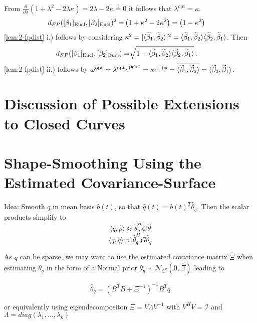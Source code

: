 From $\frac{\partial}{\partial\lambda}\left( 1 + \lambda^2 - 2\lambda\kappa \right) = 2\lambda - 2\kappa \overset{!}{=} 0$ it follows that $\lambda^\mathrm{opt} = \kappa$.
\begin{align*}
  d_{FP}([\beta_1]_{\mathrm{Eucl}},[\beta_2]_{\mathrm{Eucl}})^2 
   = &  \left( 1 + \kappa^2  - 2 \kappa^2 \right) =  \left( 1 - \kappa^2 \right)
\end{align*}
\cref{lem:2-fpdist} i.) follows by considering $\kappa^2 = \lvert\langle \widetilde \beta_1, \widetilde \beta_2 \rangle\rvert^2 = \langle \widetilde \beta_1, \widetilde \beta_2 \rangle \langle \widetilde \beta_2, \widetilde \beta_1 \rangle$.
Then
\begin{align*}
  d_{FP}([\beta_1]_{\mathrm{Eucl}},[\beta_2]_{\mathrm{Eucl}})
   = &  \sqrt{ 1 - \langle \widetilde \beta_1, \widetilde \beta_2 \rangle \langle \widetilde \beta_2, \widetilde \beta_1 \rangle }\,.
\end{align*}
\cref{lem:2-fpdist} ii.) follows by $\omega^\mathrm{opt} = \lambda^\mathrm{opt} e^{\mathrm{i}\mkern1mu \theta^\mathrm{opt}} = \kappa e^{-\mathrm{i}\mkern1mu\phi} = \overline{\langle \widetilde \beta_1, \widetilde \beta_2 \rangle} = \langle \widetilde \beta_2, \widetilde \beta_1 \rangle$.


\section{Discussion of Possible Extensions to Closed Curves}
\label{app:a-closed}


\section{Shape-Smoothing Using the Estimated Covariance-Surface}
\label{app:a-smooth}
Idea: Smooth $q$ in mean basis $b(t)$, so that $\hat{q}(t) = b(t)^T \hat{\theta}_q$. Then the scalar products simplify to
$$ \langle q, \hat{p} \rangle \approx \hat{\theta}_q^H G \hat{\theta} $$
$$ \langle q, q \rangle \approx \hat{\theta}_q^H G \hat{\theta}_q $$

As $q$ can be sparse, we may want to use the estimated covariance matrix $\hat{\Xi}$ when estimating $\theta_q$ in the form of a Normal prior $\theta_q \sim \mathcal{N}_{\mathbb{C}^k}(0, \hat\Xi)$ leading to

$$ \hat\theta_q = (B^T B + \Xi^{-1})^{-1} B^T q $$

or equivalently using eigendecompositon $\Xi = V \Lambda V^{-1}$ with $V^H V = \mathcal{I}$ and $\Lambda = diag(\lambda_1, \dots, \lambda_k)$

